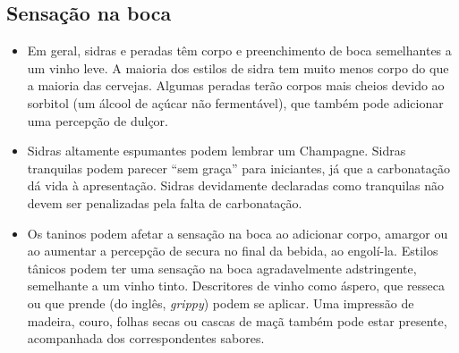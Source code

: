 \subsection*{Sensação na boca}
\begin{itemize}
\item Em geral, sidras e peradas têm corpo e preenchimento de boca semelhantes a um vinho leve. A maioria dos estilos de sidra tem muito menos corpo do que a maioria das cervejas. Algumas peradas terão corpos mais cheios devido ao sorbitol (um álcool de açúcar não fermentável), que também pode adicionar uma percepção de dulçor.
\item Sidras altamente espumantes podem lembrar um Champagne. Sidras tranquilas podem parecer “sem graça” para iniciantes, já que a carbonatação dá vida à apresentação. Sidras devidamente declaradas como tranquilas não devem ser penalizadas pela falta de carbonatação.
\item Os taninos podem afetar a sensação na boca ao adicionar corpo, amargor ou ao aumentar a percepção de secura no final da bebida, ao engolí-la. Estilos tânicos podem ter uma sensação na boca agradavelmente adstringente, semelhante a um vinho tinto. Descritores de vinho como áspero, que resseca ou que prende (do inglês, \textit{grippy}) podem se aplicar. Uma impressão de madeira, couro, folhas secas ou cascas de maçã também pode estar presente, acompanhada dos correspondentes sabores.
\end{itemize}
